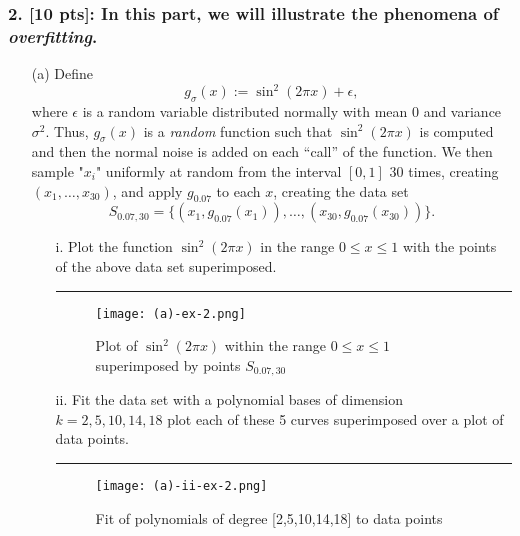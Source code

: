 \documentclass{article}
\begin{document}
\subsubsection*{2. [10 pts]: In this part, we will illustrate the phenomena of \emph{overfitting}.}

\begin{enumerate}
    \item[(a)] Define
    \[
    g_\sigma(x) := \sin^2(2\pi x) + \epsilon, \tag{7}
    \]
    where \(\epsilon\) is a random variable distributed normally with mean \(0\) and variance \(\sigma^2\). Thus, \(g_\sigma(x)\) is a \emph{random} function such that \(\sin^2(2\pi x)\) is computed and then the normal noise is added on each ``call'' of the function. We then sample "\(x_i\)" uniformly at random from the interval \([0, 1]\) 30 times, creating \((x_1, \ldots, x_{30})\), and apply \(g_{0.07}\) to each \(x\), creating the data set
    \[
    S_{0.07,30} = \{(x_1, g_{0.07}(x_1)), \ldots, (x_{30}, g_{0.07}(x_{30}))\}. \tag{8}
    \]
    
    \begin{enumerate}
        \item[i.] Plot the function \(\sin^2(2\pi x)\) in the range \(0 \leq x \leq 1\) with the points of the above data set superimposed. 

        \noindent\textcolor{gray}{\rule{0.1\linewidth}{0.5pt}}

        \begin{figure}[H]
            \centering
            \texttt{[image: (a)-ex-2.png]}
            \caption{Plot of \(\sin^2(2\pi x)\) within the range \(0 \leq x \leq 1\) superimposed by points \(S_{0.07,30}\)}
            \label{sin-[i]}
        \end{figure}

        \item[ii.] Fit the data set with a polynomial bases of dimension \(k = 2,5,10,14,18\) plot each of these 5 curves superimposed over a plot of data points.

        \noindent\textcolor{gray}{\rule{0.1\linewidth}{0.5pt}}


        \begin{figure}[H]
            \centering
            \texttt{[image: (a)-ii-ex-2.png]}
            \caption{Fit of polynomials of degree [2,5,10,14,18] to data points}
            \label{poly-[ii]}
        \end{figure}
    \end{enumerate}


\end{enumerate}
\end{document}
